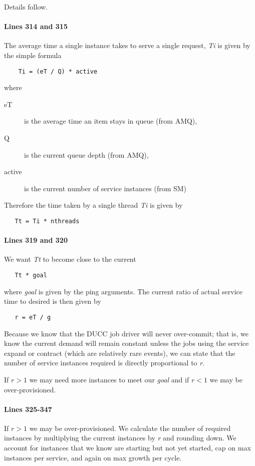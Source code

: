    Details follow.

   \paragraph{Lines 314 and 315}
   The average time a single instance takes to serve a single request, {\em Ti}  is given
   by the simple formula 

\begin{verbatim}
    Ti = (eT / Q) * active
\end{verbatim}
 where

   \begin{description}
     \item[eT] is the average time an item stays in queue (from AMQ),
     \item[Q] is the current queue depth (from AMQ),
     \item[active] is the current number of service instances (from SM)
   \end{description}

   Therefore the time taken by a single thread {\em Ti} is given by 
\begin{verbatim}
   Tt = Ti * nthreads
\end{verbatim}

   \paragraph{Lines 319 and 320}
   We want {\em Tt} to become close to the current
\begin{verbatim}
   Tt * goal 
\end{verbatim}

    where {\em goal} is given by the ping arguments.  The 
   current ratio of actual service time to desired is then given by
\begin{verbatim}
   r = eT / g
\end{verbatim}

   Because we know that the DUCC job driver will never over-commit; that is,
   we know the current demand will remain constant unless the jobs using the
   service expand or contract (which are relatively rare events), we can state
   that the number of service instances required is directly proportional
   to {\em r}.  

   If  $r > 1$ we may need more instances to meet our {\em goal} and if
   $r < 1$ we may be over-provisioned.

   \paragraph{Lines 325-347}
   If  $r > 1$ we may be over-provisioned.  We calculate the number of required
   instances by multiplying the current instances by {\em r} and rounding down.
   We account for instances that we know are starting but not yet started,
   cap on max instances per service, and again on max growth per cycle.


